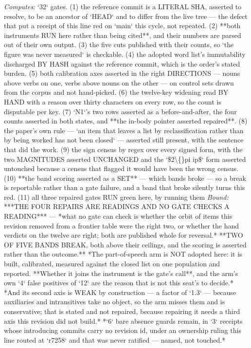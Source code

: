 \begin{description}
\emph{Computes:} `32` gates. (1) the reference commit is a LITERAL SHA, asserted to resolve, to be an ancestor of `HEAD` and to differ from the live tree --- the defect that put a receipt of this line red on `main` this cycle, not repeated. (2) **both instruments RUN here rather than being cited**, and their numbers are parsed out of their own output. (3) the five cuts published with their counts, so `the figure was never measured` is checkable. (4) the adopted word list's immutability discharged BY HASH against the reference commit, which is the order's stated burden. (5) both calibration axes asserted in the right DIRECTIONS --- nouns above verbs on one, verbs above nouns on the other --- on control sets drawn from the corpus and not hand-picked. (6) the twelve-key widening read BY HAND with a reason over thirty characters on every row, so the count is disputable per key. (7) `N1`'s two rows asserted as a before-and-after, the four counts asserted in both states, and **the in-body pointer asserted repaired**. (8) the paper's own rule --- `an item that leaves a list by reclassification rather than by being worked has not been closed` --- asserted still present, with the sentence that did the work. (9) the sign census by regex over every signed form, with the two MAGNITUDES asserted UNCHANGED and the `\$2\textbackslash\{\}pi ip\$` form asserted untouched because a census that flagged it would have been the wrong census. (10) **the band scoring asserted as a SET** --- which bands broke --- so a break is reportable rather than a gate failure, and a band that broke silently turns this red. (11) all three repaired gates RUN green here, by running them
 \emph{Bound:}  ***THE FOUR REPAIRS ARE READINGS AND NO GATE CHECKS A READING*** --- *what no gate can check is whether the orbit of items this revision removed from a frontier table were the right two, or whether the hand verdicts on the twelve are right; both are published whole for reversal.*  **TWO OF FIVE BANDS BREAK, both above their ceilings, and the scoring is asserted rather than the outcome.**  *The part-of-speech arm is NOT adopted here: it is built, calibrated, measured against the closed list on one population and reported. **Whether it joins the instrument is the gate's call**, and the arm's own `4` false positives of `12` are the reason that is not this seat's to decide.*  *And its second axis is WEAK by construction --- a factor of `1.3` --- because auxiliaries and intransitives take no object, so the arm misses them and is conservative; that is stated and not repaired, because repairing it needs a third axis this revision did not build.*  *`6` bare absence guards remain, in `3` receipts whose introducing commits carry no revision id, under an ownership ruling this line routed at `r7258` and that was never ratified --- named, not touched.*

\end{description}
